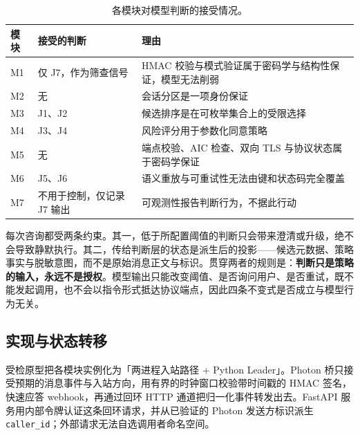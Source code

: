 \documentclass[11pt,a4paper]{article}
\begin{document}
\begin{table}[htbp]

\centering

\small

\caption{各模块对模型判断的接受情况。}\label{tab:2}

\begin{tabularx}{\textwidth}{@{}l>{\raggedright\arraybackslash}X>{\raggedright\arraybackslash}X@{}}

\toprule

\textbf{模块} & \textbf{接受的判断} & \textbf{理由} \\

\midrule

M1 & 仅 J7，作为筛查信号 & HMAC 校验与模式验证属于密码学与结构性保证，模型无法削弱 \\

M2 & 无 & 会话分区是一项身份保证 \\

M3 & J1、J2 & 候选排序是在可枚举集合上的受限选择 \\

M4 & J3、J4 & 风险评分用于参数化同意策略 \\

M5 & 无 & 端点校验、AIC 检查、双向 TLS 与协议状态属于密码学保证 \\

M6 & J5、J6 & 语义重放与可重试性无法由键和状态码完全覆盖 \\

M7 & 不用于控制，仅记录 J7 输出 & 可观测性报告判断行为，不据此行动 \\

\bottomrule

\end{tabularx}

\end{table}

每次咨询都受两条约束。其一，低于所配置阈值的判断只会带来澄清或升级，绝不会导致静默执行。其二，传给判断层的状态是派生后的投影------候选元数据、策略事实与脱敏意图，而不是原始消息正文与标识。贯穿两者的规则是：\textbf{判断只是策略的输入，永远不是授权}。模型输出只能改变阈值、是否询问用户、是否重试，既不能发起调用，也不会以指令形式抵达协议端点，因此四条不变式是否成立与模型行为无关。

\subsection{实现与状态转移}

受检原型把各模块实例化为「两进程入站路径 + Python Leader」。Photon 桥只接受预期的消息事件与入站方向，用有界的时钟窗口校验带时间戳的 HMAC 签名，快速应答 webhook，再通过回环 HTTP 通道把归一化事件转发出去。FastAPI 服务用内部令牌认证这条回环请求，并从已验证的 Photon 发送方标识派生 \texttt{caller\_\allowbreak{}id}；外部请求无法自选调用者命名空间。
\end{document}
